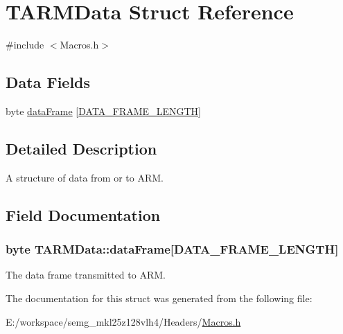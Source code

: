 \hypertarget{struct_t_a_r_m_data}{\section{T\-A\-R\-M\-Data Struct Reference}
\label{struct_t_a_r_m_data}
}


{\ttfamily \#include $<$Macros.\-h$>$}

\subsection*{Data Fields}
\begin{DoxyCompactItemize}
\item 
byte \hyperlink{struct_t_a_r_m_data_a9dba9b68fbbc00468935ce7645425271}{data\-Frame} \mbox{[}\hyperlink{group___a_r_m_const_gabb5ec28e1c20e234410dc0f24de7d735}{D\-A\-T\-A\-\_\-\-F\-R\-A\-M\-E\-\_\-\-L\-E\-N\-G\-T\-H}\mbox{]}
\end{DoxyCompactItemize}


\subsection{Detailed Description}
A structure of data from or to A\-R\-M. 

\subsection{Field Documentation}
\hypertarget{struct_t_a_r_m_data_a9dba9b68fbbc00468935ce7645425271}{
\subsubsection[{data\-Frame}]{\setlength{\rightskip}{0pt plus 5cm}byte T\-A\-R\-M\-Data\-::data\-Frame\mbox{[}{\bf D\-A\-T\-A\-\_\-\-F\-R\-A\-M\-E\-\_\-\-L\-E\-N\-G\-T\-H}\mbox{]}}}\label{struct_t_a_r_m_data_a9dba9b68fbbc00468935ce7645425271}
The data frame transmitted to A\-R\-M. 

The documentation for this struct was generated from the following file\-:\begin{DoxyCompactItemize}
\item 
E\-:/workspace/semg\-\_\-mkl25z128vlh4/\-Headers/\hyperlink{_macros_8h}{Macros.\-h}\end{DoxyCompactItemize}
